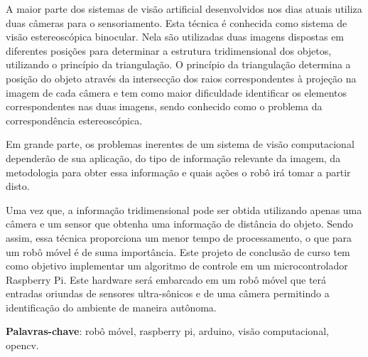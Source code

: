
\begin{resumo}
A maior parte dos sistemas de visão artificial desenvolvidos nos dias atuais utiliza duas câmeras para o sensoriamento. Esta técnica é conhecida como sistema de visão estereoscópica binocular. Nela são utilizadas duas imagens dispostas em diferentes posições para determinar a estrutura tridimensional dos objetos, utilizando o princípio da triangulação. O princípio da triangulação determina a posição do objeto através da intersecção dos raios correspondentes à projeção na imagem de cada câmera e tem como maior dificuldade identificar os elementos correspondentes nas duas imagens, sendo conhecido como o problema da correspondência estereoscópica. 

Em grande parte, os problemas inerentes de um sistema de visão computacional dependerão de sua aplicação, do tipo de informação relevante da imagem, da metodologia para obter essa informação e quais ações o robô irá tomar a partir disto.

Uma vez que, a informação tridimensional pode ser obtida utilizando apenas uma câmera e um sensor que obtenha uma informação de distância do objeto. Sendo assim, essa técnica proporciona um menor tempo de processamento, o que para um robô móvel é de suma importância. Este projeto de conclusão de curso tem como objetivo implementar um algoritmo de controle em um microcontrolador Raspberry Pi. Este hardware será embarcado em um robô móvel que terá entradas oriundas de sensores ultra-sônicos e  de uma câmera permitindo a identificação do ambiente de maneira autônoma.

\vspace{\onelineskip}
\noindent
\textbf{Palavras-chave}: robô móvel, raspberry pi, arduino, visão computacional, opencv.
\end{resumo}

        


